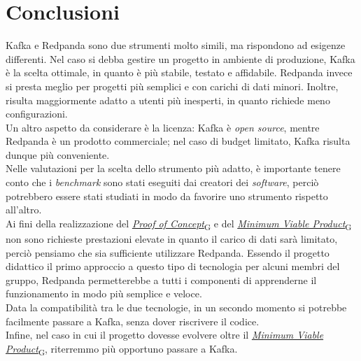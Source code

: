 \section{Conclusioni}
Kafka e Redpanda sono due strumenti molto simili, ma rispondono ad esigenze differenti.
Nel caso si debba gestire un progetto in ambiente di produzione, Kafka è la scelta ottimale, in quanto è più stabile, testato e affidabile.
Redpanda invece si presta meglio per progetti più semplici e con carichi di dati minori. Inoltre, risulta maggiormente adatto a utenti più
inesperti, in quanto richiede meno configurazioni. \\
Un altro aspetto da considerare è la licenza: Kafka è \textit{open source}, mentre Redpanda è un prodotto commerciale; nel caso di
budget limitato, Kafka risulta dunque più conveniente.\\
Nelle valutazioni per la scelta dello strumento più adatto, è importante tenere conto che i \textit{benchmark} sono stati eseguiti dai creatori dei \textit{software},
perciò potrebbero essere stati studiati in modo da favorire uno strumento rispetto all'altro.\\
Ai fini della realizzazione del \href{https://7last.github.io/docs/rtb/documentazione-interna/glossario\#proof-of-concept}{\textit{Proof of Concept}\textsubscript{G}} e del \href{https://7last.github.io/docs/rtb/documentazione-interna/glossario\#minimum-viable-product}{\textit{Minimum Viable Product}\textsubscript{G}} non sono richieste prestazioni elevate in quanto
il carico di dati sarà limitato, perciò pensiamo che sia sufficiente utilizzare Redpanda.
Essendo il progetto didattico il primo approccio a questo tipo di tecnologia per alcuni membri del gruppo, Redpanda permetterebbe a tutti i componenti di apprenderne
il funzionamento in modo più semplice e veloce.\\
Data la compatibilità tra le due tecnologie, in un secondo momento si potrebbe facilmente passare a Kafka, senza dover riscrivere il codice.\\
Infine, nel caso in cui il progetto dovesse evolvere oltre il \href{https://7last.github.io/docs/rtb/documentazione-interna/glossario\#minimum-viable-product}{\textit{Minimum Viable Product}\textsubscript{G}}, riterremmo più opportuno passare a Kafka.




